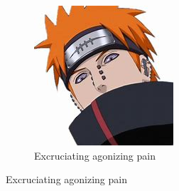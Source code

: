 \documentclass{article}
\begin{document}
\begin{figure}[h!]
\begin{subfigure}[b]{0.6\linewidth}
        \end{subfigure}
        \begin{subfigure}[b]{0.7\linewidth}
        	
       \includegraphics[width=\linewidth]{screenshot017}
        \caption{Excruciating agonizing pain}
        \label{fig:screenshot017}
        \end{subfigure}
	\end{figure}
	 
\end{document}
